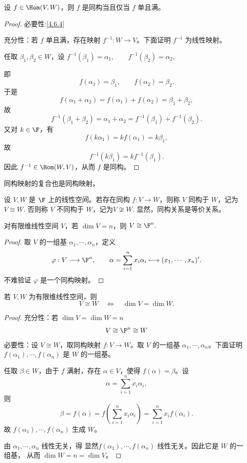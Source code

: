 \begin{lemma}
	设 $f\in\Hom(V,W)$，则 $f$ 是同构当且仅当 $f$ 单且满。
\end{lemma}

\begin{proof}
	必要性:\ref{4.6.4}
	
	充分性：若 $f$ 单且满，存在映射
	$f^{-1}:W\to V$。下面证明 $f^{-1}$ 为线性映射。
	
	任取 $\beta_1,\beta_2\in W$，设
$	f^{-1}(\beta_1)=\alpha_1,\qquad
	f^{-1}(\beta_2)=\alpha_2,$
	
	即
	\[
	f(\alpha_1)=\beta_1,\qquad
	f(\alpha_2)=\beta_2.
	\]
	于是
	\[
	f(\alpha_1+\alpha_2)=f(\alpha_1)+f(\alpha_2)=\beta_1+\beta_2,
	\]
	故
	\[
	f^{-1}(\beta_1+\beta_2)
	=
	\alpha_1+\alpha_2
	=
	f^{-1}(\beta_1)+f^{-1}(\beta_2).
	\]
	又对 $k\in\F$，有
	\[
	f(k\alpha_1)=kf(\alpha_1)=k\beta_1,
	\]
	故
	\[
	f^{-1}(k\beta_1)=kf^{-1}(\beta_1).
	\]
	因此 $f^{-1}\in\Hom(W,V)$，从而 $f$ 是同构。
\end{proof}

\begin{corollary}
	同构映射的复合也是同构映射。
\end{corollary}

\begin{definition}
	设 $V,W$ 是 $\F$ 上的线性空间。若存在同构
	$f:V\to W$，则称 $V$ 同构于 $W$，记为	$V\cong W.$
	否则称 $V$ 不同构于 $W$，记为$V\not\cong W.$
	显然，同构关系是等价关系。
\end{definition}

\begin{lemma}
	对有限维线性空间 $V$，若 $\dim V=n$，则
$V\cong \F^n.$
	
\end{lemma}

\begin{proof}
	取 $V$ 的一组基 $\alpha_1,\cdots,\alpha_n$，定义
	\[
	\varphi:V\longrightarrow \F^n,
	\qquad
	\alpha=\sum_{i=1}^{n}x_i\alpha_i
	\longmapsto
	(x_1,\cdots,x_n)'.
	\]
	不难验证 $\varphi$ 是一个同构映射。
\end{proof}

\begin{theorem}
	若 $V,W$ 为有限维线性空间，则
	\[
	V\cong W
	\quad\Longleftrightarrow\quad
	\dim V=\dim W.
	\]
\end{theorem}

\begin{proof}
	充分性：若 $\dim V=\dim W=n$
	\[V \cong \F^n \cong W\]
	必要性：设 $V\cong W$，取同构映射 $f:V\to W$。取 $V$ 的一组基
	$\alpha_1,\cdots,\alpha_n$。下面证明
	$f(\alpha_1),\cdots,f(\alpha_n)$ 是 $W$ 的一组基。
	
	任取 $\beta\in W$，由于 $f$ 满射，存在 $\alpha\in V$，使得
	$f(\alpha)=\beta$。设
	\[
	\alpha=\sum_{i=1}^{n}x_i\alpha_i,
	\]
	则
	\[
	\beta=f(\alpha)
	=f\left(\sum_{i=1}^{n}x_i\alpha_i\right)
	=\sum_{i=1}^{n}x_if(\alpha_i).
	\]
	故 $f(\alpha_1),\cdots,f(\alpha_n)$ 生成 $W$。
	

	由 $\alpha_1,\cdots,\alpha_n$ 线性无关，得
显然$f(\alpha_1),\cdots,f(\alpha_n)$ 线性无关。因此它是 $W$ 的一组基，
	从而 $\dim W=n=\dim V$。
	
	
\end{proof}

